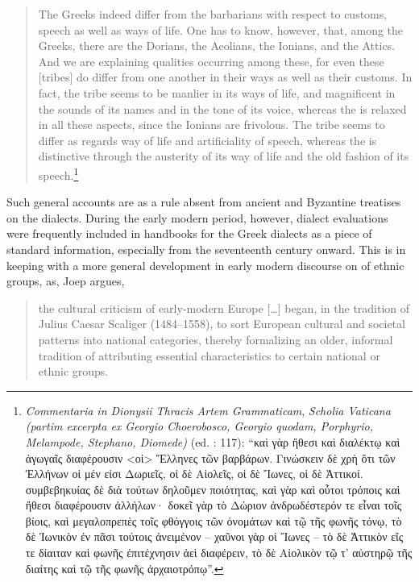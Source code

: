 \begin{quote}
The Greeks indeed differ from the barbarians with respect to customs, speech as well as ways of life. One has to know, however, that, among the Greeks, there are the Dorians, the Aeolians, the Ionians, and the Attics. And we are explaining qualities occurring among these, for even these [tribes] do differ from one another in their ways as well as their customs. In fact, the  tribe seems to be manlier in its ways of life, and magnificent in the sounds of its names and in the tone of its voice, whereas the  is relaxed in all these aspects, since the Ionians are frivolous. The  tribe seems to differ as regards way of life and artificiality of speech, whereas the  is distinctive through the austerity of its way of life and the old fashion of its speech.\footnote{%
  \textit{Commentaria in Dionysii Thracis Artem Grammaticam}, \textit{Scholia Vaticana (partim excerpta ex Georgio Choerobosco, Georgio quodam, Porphyrio, Melampode, Stephano, Diomede)} (ed. \citealt{Hilgard1901}: 117): 
  “καὶ γὰρ ἤθεσι καὶ διαλέκτῳ καὶ ἀγωγαῖς διαφέρουσιν <οἱ> Ἕλληνες τῶν βαρβάρων. Γινώσκειν δὲ χρὴ ὅτι τῶν Ἑλλήνων οἱ μέν εἰσι Δωριεῖς, οἱ δὲ Αἰολεῖς, οἱ δὲ Ἴωνες, οἱ δὲ Ἀττικοί. συμβεβηκυίας δὲ διὰ τούτων δηλοῦμεν ποιότητας, καὶ γὰρ καὶ οὗτοι τρόποις καὶ ἤθεσι διαφέρουσιν ἀλλήλων· δοκεῖ γὰρ τὸ Δώριον ἀνδρωδέστερόν τε εἶναι τοῖς βίοις, καὶ μεγαλοπρεπὲς τοῖς φθόγγοις τῶν ὀνομάτων καὶ τῷ τῆς φωνῆς τόνῳ, τὸ δὲ Ἰωνικὸν ἐν πᾶσι τούτοις ἀνειμένον – χαῦνοι γὰρ οἱ Ἴωνες – τὸ δὲ Ἀττικὸν εἴς τε δίαιταν καὶ φωνῆς ἐπιτέχνησιν ἀεὶ διαφέρειν, τὸ δὲ Αἰολικὸν τῷ τ’ αὐστηρῷ τῆς διαίτης καὶ τῷ τῆς φωνῆς ἀρχαιοτρόπῳ”.}
\end{quote}

Such general accounts are as a rule absent from ancient and Byzantine treatises on the dialects. During the early modern period, however, dialect evaluations were frequently included in handbooks for the Greek dialects as a piece of standard information, especially from the seventeenth century onward. This is in keeping with a more general development in early modern discourse on  of ethnic groups, as, Joep \citet[17]{Leerssen2007} argues,

\begin{quote}
the cultural criticism of early-modern Europe […] began, in the tradition of Julius Caesar Scaliger (1484–1558), to sort European cultural and societal patterns into national categories, thereby formalizing an older, informal tradition of attributing essential characteristics to certain national or ethnic groups.
\end{quote}

